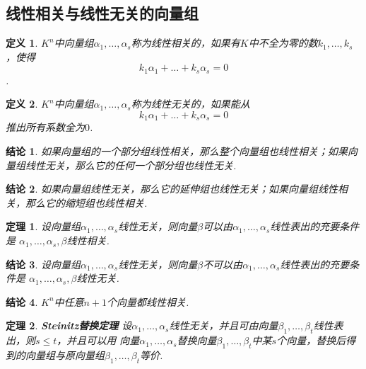 \documentclass[UTF8]{article}
\newtheorem{thrm}{定理}[subsection]
\newtheorem{defn}{定义}[subsection]
\newtheorem{ccl}{结论}[subsection]
\begin{document}
\subsection{线性相关与线性无关的向量组}
\begin{defn}
  $K^n$中向量组$\alpha_1,\ldots,\alpha_s$称为线性相关的，如果有$K$中不全为零的数$k_1,\ldots,k_s$，使得
  $$k_1\alpha_1+\ldots+k_s\alpha_s=0$$.
\end{defn}
\begin{defn}
  $K^n$中向量组$\alpha_1,\ldots,\alpha_s$称为线性无关的，如果能从
  $$k_1\alpha_1+\ldots+k_s\alpha_s=0$$
  推出所有系数全为$0$.
\end{defn}
\begin{ccl}
  如果向量组的一个部分组线性相关，那么整个向量组也线性相关；如果向量组线性无关，那么它的任何一个部分组也线性无关.
\end{ccl}
\begin{ccl}
  如果向量组线性无关，那么它的延伸组也线性无关；如果向量组线性相关，那么它的缩短组也线性相关.
\end{ccl}
\begin{thrm}
  设向量组$\alpha_1,\ldots,\alpha_s$线性无关，则向量$\beta$可以由$\alpha_1,\ldots,\alpha_s$线性表出的充要条件是
  $\alpha_1,\ldots,\alpha_s,\beta$线性相关.
\end{thrm}
\begin{ccl}
  设向量组$\alpha_1,\ldots,\alpha_s$线性无关，则向量$\beta$不可以由$\alpha_1,\ldots,\alpha_s$线性表出的充要条件是
  $\alpha_1,\ldots,\alpha_s,\beta$线性无关.
\end{ccl}
\begin{ccl}
  $K^n$中任意$n+1$个向量都线性相关.
\end{ccl}
\begin{thrm}
  \textbf{Steinitz替换定理 }设$\alpha_1,\ldots,\alpha_s$线性无关，并且可由向量$\beta_1,\ldots,\beta_t$线性表出，则$s\le t$，并且可以用
  向量$\alpha_1,\ldots,\alpha_s$替换向量$\beta_1,\ldots,\beta_t$中某$s$个向量，替换后得到的向量组与原向量组$\beta_1,\ldots,\beta_t$等价.
\end{thrm}
\end{document}
